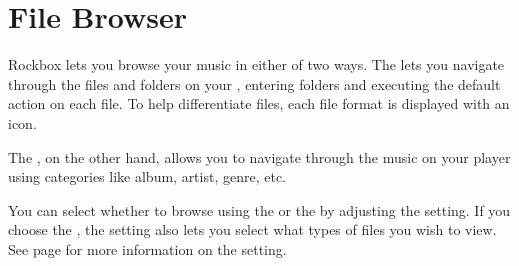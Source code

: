 \section{\label{ref:file_browser}File Browser}
Rockbox lets you browse your music in either of two ways. The 
 lets you navigate through the files and folders on 
your \dap, entering folders and executing the default action on each file.
To help differentiate files, each file format is displayed with an icon. 

The , on the other hand, allows you to navigate 
through the music on your player using categories like album, artist, genre,
etc.

You can select whether to browse using the  or the 
 by adjusting the  setting.  
If you choose the , the  setting also
lets you select what types of files you wish to view.  See page 
\pageref{ref:ShowFiles} for more information on the 
setting.



